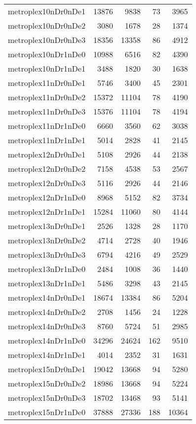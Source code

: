 \begin{tabular}{lrrrr}
metroplex10nDr0nDe1 & 13876 & 9838 & 73 & 3965 \\
metroplex10nDr0nDe2 & 3080 & 1678 & 28 & 1374 \\
metroplex10nDr0nDe3 & 18356 & 13358 & 86 & 4912 \\
metroplex10nDr1nDe0 & 10988 & 6516 & 82 & 4390 \\
metroplex10nDr1nDe1 & 3488 & 1820 & 30 & 1638 \\
metroplex11nDr0nDe1 & 5746 & 3400 & 45 & 2301 \\
metroplex11nDr0nDe2 & 15372 & 11104 & 78 & 4190 \\
metroplex11nDr0nDe3 & 15376 & 11104 & 78 & 4194 \\
metroplex11nDr1nDe0 & 6660 & 3560 & 62 & 3038 \\
metroplex11nDr1nDe1 & 5014 & 2828 & 41 & 2145 \\
metroplex12nDr0nDe1 & 5108 & 2926 & 44 & 2138 \\
metroplex12nDr0nDe2 & 7158 & 4538 & 53 & 2567 \\
metroplex12nDr0nDe3 & 5116 & 2926 & 44 & 2146 \\
metroplex12nDr1nDe0 & 8968 & 5152 & 82 & 3734 \\
metroplex12nDr1nDe1 & 15284 & 11060 & 80 & 4144 \\
metroplex13nDr0nDe1 & 2526 & 1328 & 28 & 1170 \\
metroplex13nDr0nDe2 & 4714 & 2728 & 40 & 1946 \\
metroplex13nDr0nDe3 & 6794 & 4216 & 49 & 2529 \\
metroplex13nDr1nDe0 & 2484 & 1008 & 36 & 1440 \\
metroplex13nDr1nDe1 & 5486 & 3298 & 43 & 2145 \\
metroplex14nDr0nDe1 & 18674 & 13384 & 86 & 5204 \\
metroplex14nDr0nDe2 & 2708 & 1456 & 24 & 1228 \\
metroplex14nDr0nDe3 & 8760 & 5724 & 51 & 2985 \\
metroplex14nDr1nDe0 & 34296 & 24624 & 162 & 9510 \\
metroplex14nDr1nDe1 & 4014 & 2352 & 31 & 1631 \\
metroplex15nDr0nDe1 & 19042 & 13668 & 94 & 5280 \\
metroplex15nDr0nDe2 & 18986 & 13668 & 94 & 5224 \\
metroplex15nDr0nDe3 & 18702 & 13468 & 93 & 5141 \\
metroplex15nDr1nDe0 & 37888 & 27336 & 188 & 10364 \\

\end{tabular}

